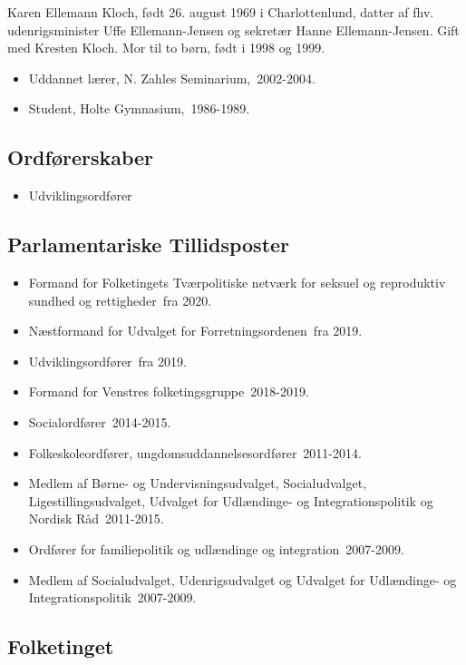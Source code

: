 \documentclass[11pt, a4paper]{awesome-cv}
\begin{document}
\makecvheader[R]
\makelettertitle
\begin{cvletter}
Karen Ellemann Kloch, født 26. august 1969 i Charlottenlund, datter af fhv. udenrigsminister Uffe Ellemann-Jensen og sekretær Hanne Ellemann-Jensen. Gift med Kresten Kloch. Mor til to børn, født i 1998 og 1999.

\begin{itemize}
\item Uddannet lærer, N. Zahles Seminarium, 2002-2004.
\item Student, Holte Gymnasium, 1986-1989.
\end{itemize}
\subsection*{Ordførerskaber}
\begin{itemize}
\item Udviklingsordfører
\end{itemize}
\subsection*{Parlamentariske Tillidsposter}
\begin{itemize}
\item Formand for Folketingets Tværpolitiske netværk for seksuel og reproduktiv sundhed og rettigheder fra 2020.
\item Næstformand for Udvalget for Forretningsordenen fra 2019.
\item Udviklingsordfører fra 2019.
\item Formand for Venstres folketingsgruppe 2018-2019.
\item Socialordfører 2014-2015.
\item Folkeskoleordfører, ungdomsuddannelsesordfører 2011-2014.
\item Medlem af Børne- og Undervisningsudvalget, Socialudvalget, Ligestillingsudvalget, Udvalget for Udlændinge- og Integrationspolitik og Nordisk Råd 2011-2015.
\item Ordfører for familiepolitik og udlændinge og integration 2007-2009.
\item Medlem af Socialudvalget, Udenrigsudvalget og Udvalget for Udlændinge- og Integrationspolitik 2007-2009.
\end{itemize}
\subsection*{Folketinget}

\end{cvletter}
\end{document}
